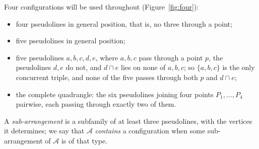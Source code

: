 \documentclass[11pt,a4paper]{amsart}
\theoremstyle{definition}
\theoremstyle{remark}
\newcommand{\II}[1]{\mathrm{II}_{#1}}
\newcommand{\IIp}{\mathrm{II}'_{3,2}}
\newcommand{\III}{\mathrm{III}_{6}}
\newcommand{\A}{\mathcal A}
\begin{document}
Four configurations will be used throughout (Figure~\ref{fig:four}):
\begin{itemize}[leftmargin=2.2em]
\item[$\II4$] four pseudolines in general position, that is, no three through a point;
\item[$\II5$] five pseudolines in general position;
\item[$\IIp$] five pseudolines $a, b, c, d, e$, where $a, b, c$ pass through a point $p$, the pseudolines $d, e$ do not, and $d \cap e$ lies on none of $a, b, c$; so $\{a,b,c\}$ is the only concurrent triple, and none of the five passes through both $p$ and $d \cap e$;
\item[$\III$] the complete quadrangle: the six pseudolines joining four points $P_1, \dots, P_4$ pairwise, each passing through exactly two of them.
\end{itemize}
A \emph{sub-arrangement} is a subfamily of at least three pseudolines, with the vertices it determines; we say that $\A$ \emph{contains} a configuration when some sub-arrangement of $\A$ is of that type.
\end{document}
